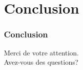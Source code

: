 \section{Conclusion}
\begin{frame}
	\frametitle{Conclusion}
	\begin{center}
		Merci de votre attention.\\
		Avez-vous des questions?
	\end{center}
\end{frame}

